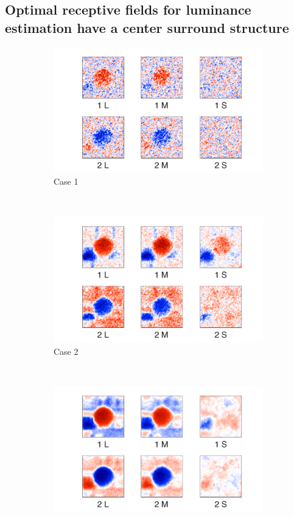 \documentclass{jov}
\begin{document}
\subsection{Optimal receptive fields for luminance estimation have a center surround structure}
\begin{figure}
\centering
\begin{subfigure}{0.21 \textwidth}
	\includegraphics[width=\textwidth]{../Figures/Figure14/Figure14_a.pdf}
	\caption{Case 1}
	\label{fig:case1Filter}
    \end{subfigure}
    ~ ~ ~
    \begin{subfigure}{0.21 \textwidth}   
	\includegraphics[width=\textwidth]{../Figures/Figure14/Figure14_b.pdf}
	\caption{Case 2}
	\label{fig:case2Filter}
    \end{subfigure}
    ~ ~ ~
        \begin{subfigure}{0.21 \textwidth}
	\includegraphics[width=\textwidth]{../Figures/Figure14/Figure14_c.pdf}

\end{subfigure}
\end{figure}
\end{document}
